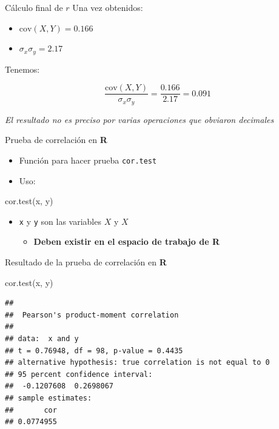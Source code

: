 \documentclass[
  11pt,
  ignorenonframetext,
]{beamer}
\newenvironment{Shaded}{}{}
\newcommand{\FunctionTok}[1]{\textcolor[rgb]{0.02,0.16,0.49}{#1}}
\newcommand{\NormalTok}[1]{#1}
\providecommand{\tightlist}{%
  \setlength{\itemsep}{0pt}\setlength{\parskip}{0pt}}
\begin{document}
\begin{frame}{Cálculo final de \(r\)}
\protect\hypertarget{cuxe1lculo-final-de-r}{}
Una vez obtenidos:

\begin{itemize}
\tightlist
\item
  \(\mathrm{cov}(X, Y) = 0.166\)
\item
  \(\sigma_x \sigma_y = 2.17\)
\end{itemize}

Tenemos:

\begin{equation*}
 \frac{\mathrm{cov}(X, Y)}{\sigma_x \sigma_y} = \frac{0.166}{2.17} = 0.091
\end{equation*}

\emph{El resultado no es preciso por varias operaciones que obviaron
decimales}
\end{frame}

\begin{frame}[fragile]{Prueba de correlación en \textbf{R}}
\protect\hypertarget{prueba-de-correlaciuxf3n-en-r}{}
\begin{itemize}
\item
  Función para hacer prueba \texttt{cor.test}
\item
  Uso:
\end{itemize}

\begin{Shaded}
\begin{Highlighting}[]
\FunctionTok{cor.test}\NormalTok{(x, y)}
\end{Highlighting}
\end{Shaded}

\begin{itemize}
\item
  \texttt{x} y \texttt{y} son las variables \(X\) y \(X\)

  \begin{itemize}
  \tightlist
  \item
    \textbf{Deben existir en el espacio de trabajo de R}
  \end{itemize}
\end{itemize}
\end{frame}

\begin{frame}[fragile]{Resultado de la prueba de correlación en
\textbf{R}}
\protect\hypertarget{resultado-de-la-prueba-de-correlaciuxf3n-en-r}{}
\begin{Shaded}
\begin{Highlighting}[]
\FunctionTok{cor.test}\NormalTok{(x, y)}
\end{Highlighting}
\end{Shaded}

\begin{verbatim}
## 
##  Pearson's product-moment correlation
## 
## data:  x and y
## t = 0.76948, df = 98, p-value = 0.4435
## alternative hypothesis: true correlation is not equal to 0
## 95 percent confidence interval:
##  -0.1207608  0.2698067
## sample estimates:
##       cor 
## 0.0774955
\end{verbatim}
\end{frame}
\end{document}
